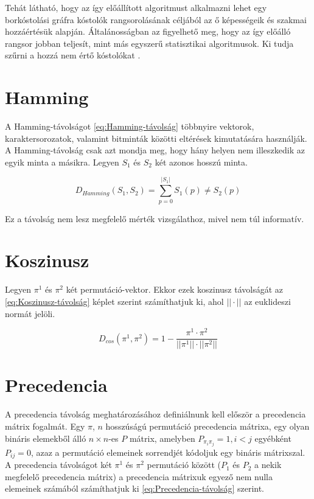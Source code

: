 \documentclass[12pt]{report}
\theoremstyle{definition}
\begin{document}
	Tehát látható, hogy az így előállított algoritmust alkalmazni lehet egy borkóstolási gráfra kóstolók rangsorolásának céljából az ő képességeik és szakmai hozzáértésük alapján. Általánosságban az figyelhető meg, hogy az így előálló rangsor jobban teljesít, mint más egyszerű statisztikai algoritmusok. Ki tudja szűrni a hozzá nem értő kóstolókat \cite{CoHITS}.
	
	\section{Hamming}
	A Hamming-távolságot \ref{eq:Hamming-távolság} többnyire vektorok, karaktersorozatok, valamint bitminták közötti eltérések kimutatására használják. A Hamming-távolság csak azt mondja meg, hogy hány helyen nem illeszkedik az egyik minta a másikra. Legyen $ S_{1} $ és $ S_{2} $ két azonos hosszú minta.
	
	\begin{equation} \label{eq:Hamming-távolság}
	D_{Hamming}\left ( S_{1},S_{2} \right )=\sum_{p=0}^{|S_{1}|}S_{1}\left(p\right)\neq S_{2}\left(p\right)
	\end{equation}
	
	Ez a távolság nem lesz megfelelő mérték vizsgálathoz, mivel nem túl informatív.
	
	\section{Koszinusz}
	Legyen $ \pi^1 $ és $ \pi^2 $ két permutáció-vektor. Ekkor ezek koszinusz távolságát az \ref{eq:Koszinusz-távolság} képlet szerint számíthatjuk ki, ahol $ || \cdot || $ az euklideszi normát jelöli.
	
	\begin{equation} \label{eq:Koszinusz-távolság}
	D_{cos}\left(\pi^1,\pi^2\right)=1-\dfrac{\pi^1\cdot\pi^2}{||\pi^1||\cdot||\pi^2||}
	\end{equation}
	
	\section{Precedencia}
	A precedencia távolság meghatározásához definiálnunk kell először a precedencia mátrix fogalmát. Egy $ \pi $, $ n $ hosszúságú permutáció precedencia mátrixa, egy olyan bináris elemekből álló $ n \times n $-es $ P $ mátrix, amelyben $ P_{\pi_{i}\pi_{j}}=1, i<j $ egyébként $P_{ij}=0$, azaz a permutáció elemeinek sorrendjét kódoljuk egy bináris mátrixszal. A precedencia távolságot két $\pi^1$ és $\pi^2$ permutáció között ($P_{1}$ és $P_{2}$ a nekik megfelelő precedencia mátrix) a precedencia mátrixuk egyező nem nulla elemeinek számából számíthatjuk ki \ref{eq:Precedencia-távolság} szerint.
	
\end{document}
